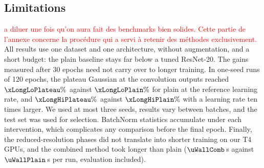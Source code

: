 \subsection{Limitations}
\textcolor{red}{a diluer une fois qu'on aura fait des benchmarks bien solides. Cette partie de l'annexe concerne la procédure qui a servi à retenir des méthodes exclusivement. }
All results use one dataset and one architecture, without augmentation, and a short budget: the plain baseline stays far below a tuned ResNet-20. The gains measured after 30 epochs need not carry over to longer training. In one-seed runs of 120 epochs, the plateau Gaussian at the convolution outputs reached $\xLongLoPlateau\%$ against $\xLongLoPlain\%$ for plain at the reference learning rate, and $\xLongHiPlateau\%$ against $\xLongHiPlain\%$ with a learning rate ten times larger. We used at most three seeds, results vary between batches, and the test set was used for selection. BatchNorm statistics accumulate under each intervention, which complicates any comparison before the final epoch. Finally, the reduced-resolution phases did not translate into shorter training on our T4 GPUs, and the combined method took longer than plain ($\uWallComb$\,s against $\uWallPlain$\,s per run, evaluation included).
